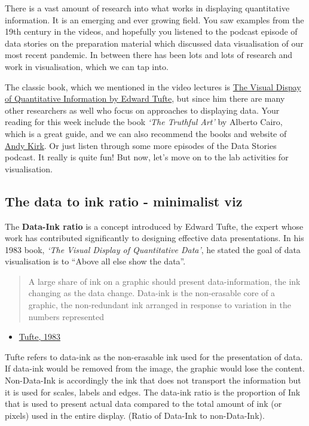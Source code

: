 \documentclass[
]{book}
\providecommand{\tightlist}{%
  \setlength{\itemsep}{0pt}\setlength{\parskip}{0pt}}
\begin{document}
There is a vast amount of research into what works in displaying quantitative information. It is an emerging and ever growing field. You saw examples from the 19th century in the videos, and hopefully you listened to the podcast episode of data stories on the preparation material which discussed data visualisation of our most recent pandemic. In between there has been lots and lots of research and work in visualisation, which we can tap into.

The classic book, which we mentioned in the video lectures is \href{https://www.edwardtufte.com/tufte/books_vdqi}{The Visual Dispay of Quantitative Information by Edward Tufte}, but since him there are many other researchers as well who focus on approaches to displaying data. Your reading for this week include the book \emph{`The Truthful Art'} by Alberto Cairo, which is a great guide, and we can also recommend the books and website of \href{https://www.visualisingdata.com/}{Andy Kirk}. Or just listen through some more episodes of the Data Stories podcast. It really is quite fun! But now, let's move on to the lab activities for visualisation.

\hypertarget{the-data-to-ink-ratio---minimalist-viz}{%
\subsection{The data to ink ratio - minimalist viz}\label{the-data-to-ink-ratio---minimalist-viz}}

The \textbf{Data-Ink ratio} is a concept introduced by Edward Tufte, the expert whose work has contributed significantly to designing effective data presentations. In his 1983 book, \emph{`The Visual Display of Quantitative Data'}, he stated the goal of data visualisation is to ``Above all else show the data''.

\begin{quote}
A large share of ink on a graphic should present data-information, the ink changing as the data change. Data-ink is the non-erasable core of a graphic, the non-redundant ink arranged in response to variation in the numbers represented
\end{quote}

\begin{itemize}
\tightlist
\item
  \href{https://www.edwardtufte.com/tufte/books_vdqi}{Tufte, 1983}
\end{itemize}

Tufte refers to data-ink as the non-erasable ink used for the presentation of data. If data-ink would be removed from the image, the graphic would lose the content. Non-Data-Ink is accordingly the ink that does not transport the information but it is used for scales, labels and edges. The data-ink ratio is the proportion of Ink that is used to present actual data compared to the total amount of ink (or pixels) used in the entire display. (Ratio of Data-Ink to non-Data-Ink).
\end{document}
